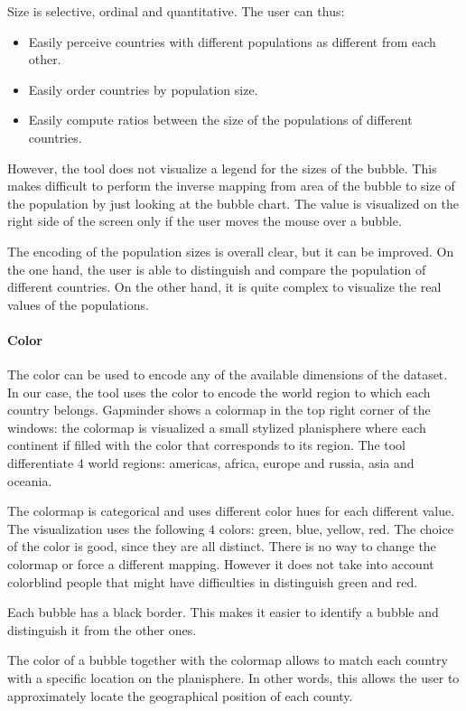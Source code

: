 Size is selective, ordinal and quantitative.
The user can thus:
\begin{itemize}
    \item Easily perceive countries with different populations as different from each other.
    \item Easily order countries by population size.
    \item Easily compute ratios between the size of the populations of different countries.
\end{itemize}

However, the tool does not visualize a legend for the sizes of the bubble.
This makes difficult to perform the inverse mapping from area of the bubble to size of the population by just looking at the bubble chart.
The value is visualized on the right side of the screen only if the user moves the mouse over a bubble.

The encoding of the population sizes is overall clear, but it can be improved.
On the one hand, the user is able to distinguish and compare the population of different countries.
On the other hand, it is quite complex to visualize the real values of the populations.


\paragraph{Color}
\label{paragraph:bubbles-color}
The color can be used to encode any of the available dimensions of the dataset.
In our case, the tool uses the color to encode the world region to which each country belongs.
Gapminder shows a colormap in the top right corner of the windows:
the colormap is visualized a small stylized planisphere where each continent if filled with the color that corresponds to its region.
The tool differentiate $4$ world regions: americas, africa, europe and russia, asia and oceania.

The colormap is categorical and uses different color hues for each different value.
The visualization uses the following $4$ colors: green, blue, yellow, red.
The choice of the color is good, since they are all distinct.
There is no way to change the colormap or force a different mapping.
However it does not take into account colorblind people that might have difficulties in distinguish green and red.

Each bubble has a black border.
This makes it easier to identify a bubble and distinguish it from the other ones.

The color of a bubble together with the colormap allows to match each country with a specific location on the planisphere.
In other words, this allows the user to approximately locate the geographical position of each county.

